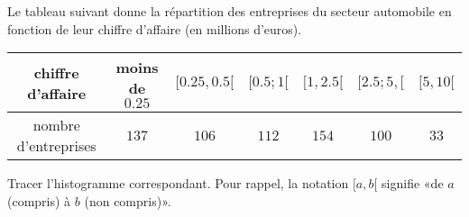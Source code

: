 
\begin{exercice}\label{exoSeconde-0033}

    Le tableau suivant donne la répartition des entreprises du secteur automobile en fonction de leur chiffre d'affaire (en millions d'euros).

    \begin{center}
    \begin{tabular}{|c||c|c|c|c|c|c|}
        \hline
        chiffre d'affaire&moins de \( 0.25\)&\( \mathopen[ 0.25 ,0.5 [\)&$\mathopen[ 0.5;1  [$&$\mathopen[ 1 , 2.5 [$&$\mathopen[ 2.5;5 ,  [$&$\mathopen[ 5 , 10 [$\\
            \hline\hline
            nombre d'entreprises&\( 137\)&\( 106\)&\( 112\)&$154$&\( 100\)&\( 33\)\\
            \hline
    \end{tabular}
    \end{center}

    Tracer l'histogramme correspondant. Pour rappel, la notation \( \mathopen[ a , b [\) signifie «de \( a\) (compris) à \( b\) (non compris)».

\end{exercice}
